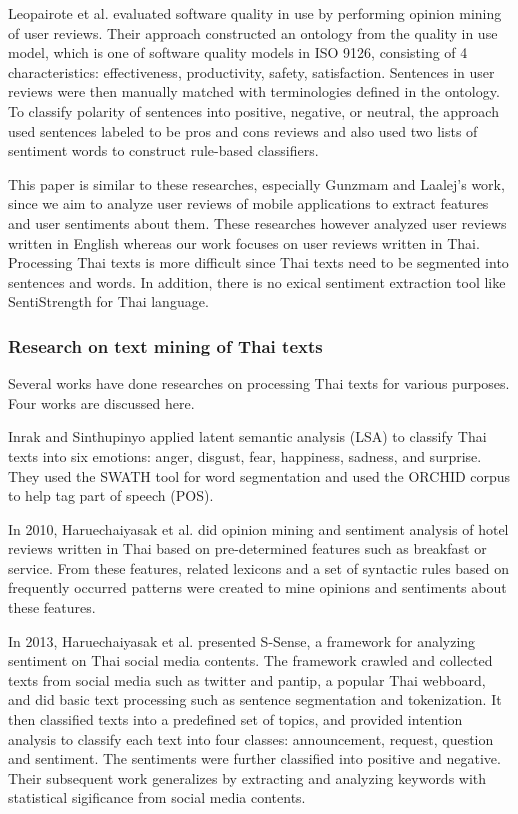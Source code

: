 Leopairote et al. \cite{leopairote2} evaluated software quality in use by performing opinion mining of user reviews. Their approach constructed an ontology from the quality in use model, which is one of software quality models in ISO 9126, consisting of 4 characteristics: effectiveness, productivity, safety, satisfaction. Sentences in user reviews were then manually matched with terminologies defined in the ontology. To classify polarity of sentences into positive, negative, or neutral, the approach used sentences labeled to be pros and cons reviews and also used two lists of sentiment words to construct rule-based classifiers.

This paper is similar to these researches, especially Gunzmam and Laalej's work, since we aim to analyze user reviews of mobile applications to extract features and user sentiments about them. These researches however analyzed user reviews written in English whereas our work focuses on user reviews written in Thai. Processing Thai texts is more difficult since Thai texts need to be segmented into sentences and words. In addition, there is no exical sentiment extraction tool like SentiStrength for Thai language. 

\subsubsection{Research on text mining of Thai texts} Several works have done researches on processing Thai texts for various purposes. Four works are discussed here.

Inrak and Sinthupinyo \cite{emotioninthai} applied latent semantic analysis (LSA) \cite{LSA} to classify Thai texts into six emotions: anger, disgust, fear, happiness, sadness, and surprise. They used the SWATH \cite{SWATH} tool for word segmentation and used the ORCHID \cite{ORCHID} corpus to help tag part of speech (POS).

In 2010, Haruechaiyasak et al. \cite{thaiopinionmininghotel} did opinion mining and sentiment analysis of hotel reviews written in Thai based on pre-determined features such as breakfast or service. From these features, related lexicons and a set of syntactic rules based on frequently occurred patterns were created to mine opinions and sentiments about these features.

In 2013, Haruechaiyasak et al. \cite{ssense} presented S-Sense, a framework for analyzing sentiment on Thai social media contents. The framework crawled and collected texts from social media such as twitter and pantip, a popular Thai webboard, and did basic text processing such as sentence segmentation and tokenization. It then classified texts into a predefined set of topics, and provided intention analysis to classify each text into four classes: announcement, request, question and sentiment. The sentiments were further classified into positive and negative. Their subsequent work \cite{ssense2} generalizes by extracting and analyzing keywords with statistical sigificance from social media contents.

